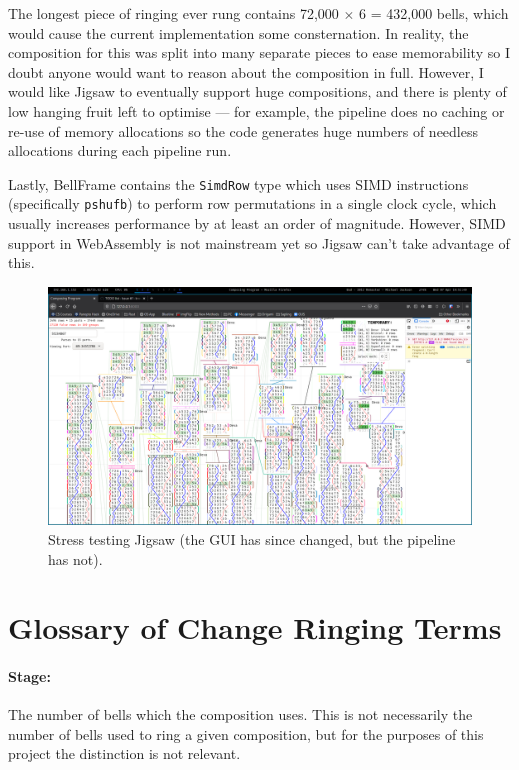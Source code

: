 \documentclass[12pt]{article}
\begin{document}
The longest piece of ringing ever rung contains 72,000 $\times$ 6 = 432,000 bells, which would cause
the current implementation some consternation.  In reality, the composition for this was split into
many separate pieces to ease memorability so I doubt anyone would want to reason about the
composition in full.  However, I would like Jigsaw to eventually support huge compositions, and
there is plenty of low hanging fruit left to optimise --- for example, the pipeline does no caching
or re-use of memory allocations so the code generates huge numbers of needless allocations during
each pipeline run.

Lastly, BellFrame contains the \verb|SimdRow| type which uses SIMD instructions
(specifically \verb|pshufb|) to perform row permutations in a single clock cycle, which usually
increases performance by at least an order of magnitude.  However, SIMD support in WebAssembly is
not mainstream yet so Jigsaw can't take advantage of this.

\begin{figure}
    \centering
    \includegraphics[width=\textwidth]{stress-test}
    \caption{Stress testing Jigsaw (the GUI has since changed, but the pipeline has
    not).}\label{fig:stress-test}
\end{figure}



\pagebreak

\section{Glossary of Change Ringing Terms}

\paragraph{Stage:} The number of bells which the composition uses.  This is not necessarily the
number of bells used to ring a given composition, but for the purposes of this project the
distinction is not relevant.
\end{document}
